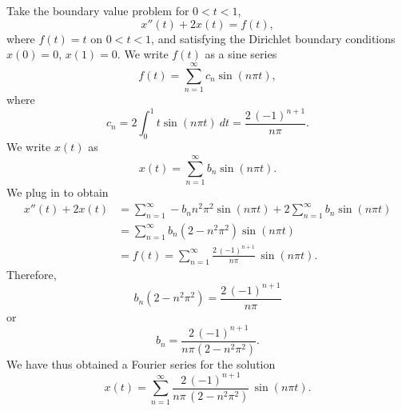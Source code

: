 \documentclass[12pt]{book}
\begin{document}
\begin{example}
Take the boundary value problem for $0 < t < 1$,
\begin{equation*}
x''(t) + 2 x(t) = f(t) ,
\end{equation*}
where $f(t) = t$ on $0 < t < 1$, and 
satisfying the Dirichlet boundary conditions
$x(0) = 0$, $x(1)=0$.
We write $f(t)$ as a sine series
\begin{equation*}
f(t) = \sum_{n=1}^\infty c_n \sin (n \pi t) ,
\end{equation*}
where
\begin{equation*}
c_n = 2 \int_0^1 t \sin (n \pi t) ~dt = \frac{2 \, {(-1)}^{n+1}}{n \pi} .
\end{equation*}
We write $x(t)$ as
\begin{equation*}
x(t) = \sum_{n=1}^\infty b_n \sin (n \pi t) .
\end{equation*}
We plug in to obtain 
\begin{equation*}
\begin{split}
x''(t) + 2 x(t) & =
\sum_{n=1}^\infty - b_n n^2 \pi^2 \sin (n \pi t) 
+
2
\sum_{n=1}^\infty b_n \sin (n \pi t)
\\
& =
\sum_{n=1}^\infty b_n (2 - n^2 \pi^2 ) \sin (n \pi t)
\\
& = f(t)
=
\sum_{n=1}^\infty  \frac{2\, {(-1)}^{n+1}}{n \pi} \, \sin (n \pi t) .
\end{split}
\end{equation*}
Therefore,
\begin{equation*}
b_n (2 - n^2 \pi^2)
=
\frac{2\,{(-1)}^{n+1}}{n \pi}
\end{equation*}
or
\begin{equation*}
b_n
=
\frac{2\,{(-1)}^{n+1}}{n \pi (2 - n^2 \pi^2)} .
\end{equation*}
We have thus obtained a Fourier series for the solution
\begin{equation*}
x(t) = 
\sum_{n=1}^\infty
\frac{2\,{(-1)}^{n+1}}{n \pi \,(2 - n^2 \pi^2)} \,
\sin (n \pi t) .
\end{equation*}
\end{example}
\end{document}

